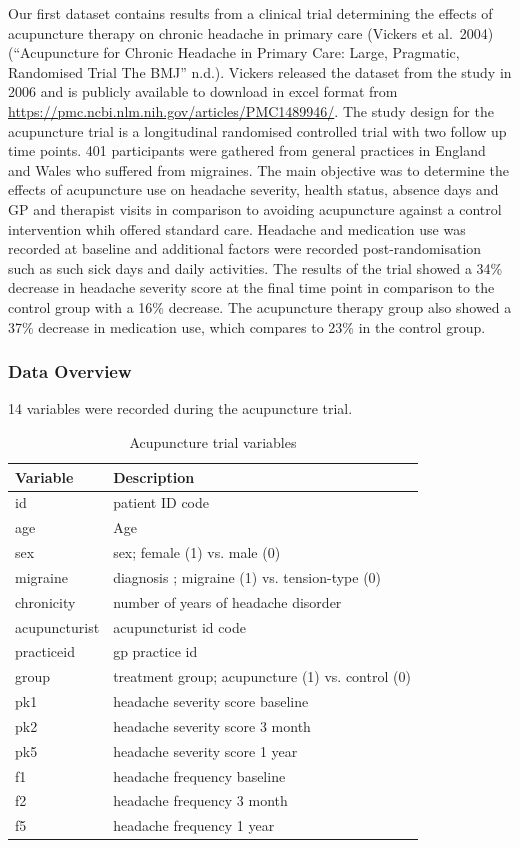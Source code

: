 \documentclass{article}
\begin{document}
Our first dataset contains results from a clinical trial determining the
effects of acupuncture therapy on chronic headache in primary care
(Vickers et al.~2004) ({``Acupuncture for Chronic Headache in Primary
Care: Large, Pragmatic, Randomised Trial {\textbar} {The} {BMJ}''}
n.d.). Vickers released the dataset from the study in 2006 and is
publicly available to download in excel format from
\url{https://pmc.ncbi.nlm.nih.gov/articles/PMC1489946/}. The study
design for the acupuncture trial is a longitudinal randomised controlled
trial with two follow up time points. 401 participants were gathered
from general practices in England and Wales who suffered from migraines.
The main objective was to determine the effects of acupuncture use on
headache severity, health status, absence days and GP and therapist
visits in comparison to avoiding acupuncture against a control
intervention whih offered standard care. Headache and medication use was
recorded at baseline and additional factors were recorded
post-randomisation such as such sick days and daily activities. The
results of the trial showed a 34\% decrease in headache severity score
at the final time point in comparison to the control group with a 16\%
decrease. The acupuncture therapy group also showed a 37\% decrease in
medication use, which compares to 23\% in the control group.

\subsubsection{Data Overview}\label{data-overview}

14 variables were recorded during the acupuncture trial.

\begin{table}[H]
\centering
\caption{Acupuncture trial variables}
\label{}

\begin{tabular}{ll}
\toprule
Variable & Description\\
\midrule
id & patient ID code\\
age & Age\\
sex & sex; female (1) vs. male (0)\\
migraine & diagnosis ; migraine (1) vs. tension-type (0)\\
chronicity & number of years of headache disorder\\
\addlinespace
acupuncturist & acupuncturist id code\\
practiceid & gp practice id\\
group & treatment group; acupuncture (1) vs. control (0)\\
pk1 & headache severity score baseline\\
pk2 & headache severity score 3 month\\
\addlinespace
pk5 & headache severity score 1 year\\
f1 & headache frequency baseline\\
f2 & headache frequency 3 month\\
f5 & headache frequency 1 year\\
\bottomrule
\end{tabular}
\end{table}
\end{document}
